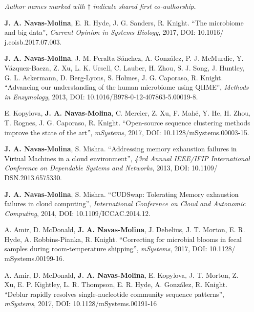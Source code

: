 \begin{frontmatter}
\begin{vitapage}
\begin{publications}

    \item \textsl{Author names marked with $\dagger$ indicate shared first co-authorship}.

    \item \textbf{J. A. Navas-Molina}, E. R. Hyde, J. G. Sanders, R. Knight. ``The microbiome and big data'', \emph{Current Opinion in Systems Biology}, 2017, DOI: 10.1016/ j.coisb.2017.07.003.

	\item \textbf{J. A. Navas-Molina}, J. M. Peralta-S\'anchez, A. Gonz\'alez, P. J. McMurdie, Y. V\'azquez-Baeza, Z. Xu, L. K. Ursell, C. Lauber, H. Zhou, S. J. Song, J. Huntley, G. L. Ackermann, D. Berg-Lyons, S. Holmes, J. G. Caporaso, R. Knight. ``Advancing our understanding of the human microbiome using QIIME'', \emph{Methods in Enzymology}, 2013, DOI: 10.1016/B978-0-12-407863-5.00019-8.

	\item E. Kopylova, \textbf{J. A. Navas-Molina}, C. Mercier, Z. Xu, F. Mah\'e, Y. He, H. Zhou, T. Rognes, J. G. Caporaso, R. Knight. ``Open-source sequence clustering methods improve the state of the art'', \emph{mSystems}, 2017, DOI: 10.1128/mSystems.00003-15.

	\item \textbf{J. A. Navas-Molina}, S. Mishra. ``Addressing memory exhaustion failures in Virtual Machines in a cloud environment'', \emph{43rd Annual IEEE/IFIP International Conference on Dependable Systems and Networks}, 2013, DOI: 10.1109/ DSN.2013.6575330.

	\item \textbf{J. A. Navas-Molina}, S. Mishra. ``CUDSwap: Tolerating Memory exhaustion failures in cloud computing'', \emph{International Conference on Cloud and Autonomic Computing}, 2014, DOI: 10.1109/ICCAC.2014.12.

	\item A. Amir, D. McDonald, \textbf{J. A. Navas-Molina}, J. Debelius, J. T. Morton, E. R. Hyde, A. Robbins-Pianka, R. Knight. ``Correcting for microbial blooms in fecal samples during room-temperature shipping'', \emph{mSystems}, 2017, DOI: 10.1128/ mSystems.00199-16.

	\item A. Amir, D. McDonald, \textbf{J. A. Navas-Molina}, E. Kopylova, J. T. Morton, Z. Xu, E. P. Kightley, L. R. Thompson, E. R. Hyde, A. Gonz\'alez, R. Knight. ``Deblur rapidly resolves single-nucleotide community sequence patterns'', \emph{mSystems}, 2017, DOI: 10.1128/mSystems.00191-16


\end{publications}
\end{vitapage}
\end{frontmatter}
